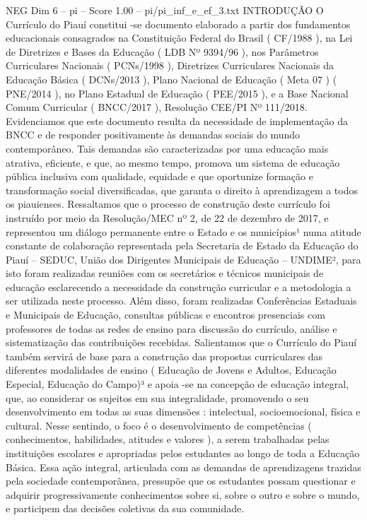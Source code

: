 \begin{textsample}{NEG Dim 6 – pi – Score 1.00 – pi/pi\_inf\_e\_ef\_3.txt}  \label{ex:f6_neg_092}
INTRODUÇÃO O Currículo do Piauí constitui -se documento elaborado a partir dos fundamentos educacionais consagrados na Constituição Federal do Brasil ( CF/1988 ), na Lei de Diretrizes e Bases da Educação ( LDB Nº 9394/96 ), nos Parâmetros Curriculares Nacionais ( PCNs/1998 ), Diretrizes Curriculares Nacionais da Educação Básica ( DCNs/2013 ), Plano Nacional de Educação ( Meta 07 ) ( PNE/2014 ), no Plano Estadual de Educação ( PEE/2015 ), e a Base Nacional Comum Curricular ( BNCC/2017 ), Resolução CEE/PI Nº 111/2018.
Evidenciamos que este documento resulta da necessidade de implementação da BNCC e de responder positivamente às demandas sociais do mundo contemporâneo.
Tais demandas são caracterizadas por uma educação mais atrativa, eficiente, e que, ao mesmo tempo, promova um sistema de educação pública inclusiva com qualidade, equidade e que oportunize formação e transformação social diversificadas, que garanta o direito à aprendizagem a todos os piauienses.
Ressaltamos que o processo de construção deste currículo foi instruído por meio da Resolução/MEC nº 2, de 22 de dezembro de 2017, e representou um diálogo permanente entre o Estado e os municípios¹ numa atitude constante de colaboração representada pela Secretaria de Estado da Educação do Piauí – SEDUC, União dos Dirigentes Municipais de Educação – UNDIME², para isto foram realizadas reuniões com os secretários e técnicos municipais de educação esclarecendo a necessidade da construção curricular e a metodologia a ser utilizada neste processo.
Além disso, foram realizadas Conferências Estaduais e Municipais de Educação, consultas públicas e encontros presenciais com professores de todas as redes de ensino para discussão do currículo, análise e sistematização das contribuições recebidas.
Salientamos que o Currículo do Piauí também servirá de base para a construção das propostas curriculares das diferentes modalidades de ensino ( Educação de Jovens e Adultos, Educação Especial, Educação do Campo)³ e apoia -se na concepção de educação integral, que, ao considerar os sujeitos em sua integralidade, promovendo o seu desenvolvimento em todas as suas dimensões : intelectual, socioemocional, física e cultural.
Nesse sentindo, o foco é o desenvolvimento de competências ( conhecimentos, habilidades, atitudes e valores ), a serem trabalhadas pelas instituições escolares e apropriadas pelos estudantes ao longo de toda a Educação Básica.
Essa ação integral, articulada com as demandas de aprendizagens trazidas pela sociedade contemporânea, pressupõe que os estudantes possam questionar e adquirir progressivamente conhecimentos sobre si, sobre o outro e sobre o mundo, e participem das decisões coletivas da sua comunidade.

\end{textsample}
